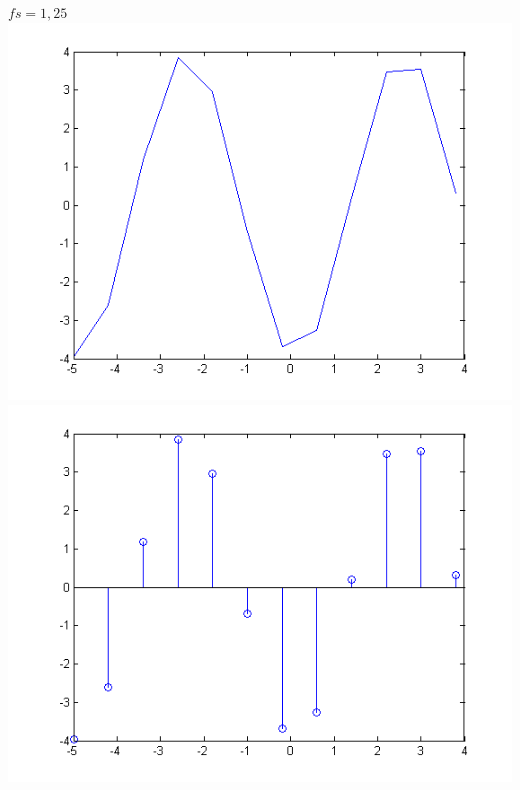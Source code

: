 \documentclass[a4paper,12pt]{article}
\begin{document}
\begin{enumerate}
\begin{center}
$fs = 1,25$
\includegraphics[width=.9 \textwidth]{../ejercicio-4-b-4.png}
\includegraphics[width=.9 \textwidth]{../ejercicio-4-b-3.png}
\end{center}


\end{enumerate}
\end{document}
